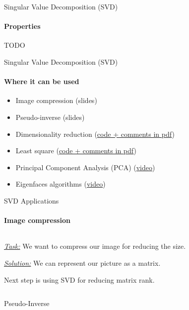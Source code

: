 \documentclass[aspectratio=169]{beamer}
\begin{document}
\begin{frame}[t]{Singular Value Decomposition (SVD)}
\framesubtitle{Properties}
    TODO
\end{frame}

\begin{frame}[t]{Singular Value Decomposition (SVD)}
\framesubtitle{Where it can be used}
\Large
    \begin{itemize}
        \item Image compression (slides)
        \item Pseudo-inverse (slides)
        \item Dimensionality reduction (\href{https://yadi.sk/i/kYK7E8whUsW1rA}{code + comments in pdf})
        \item Least square (\href{https://yadi.sk/i/DKxQ2F7AlN0zww}{code + comments in pdf})
        \item Principal Component Analysis (PCA) (\href{https://youtu.be/a9jdQGybYmE}{video})
        \item Eigenfaces algorithms (\href{https://youtu.be/_lY74pXWlS8}{video})
    \end{itemize}
\end{frame}

\begin{frame}[t]{SVD Applications}
\framesubtitle{Image compression}
\begin{columns}[T,onlytextwidth]
    \begin{column}{0.39\textwidth}
        \textit{\underline{Task:}} We want to compress our image for reducing the size.

\textit{\underline{Solution:}} We can represent our picture as a matrix. 

Next step is using SVD for reducing matrix rank. 

    \end{column}
    \begin{column}{0.59\textwidth}
        
    \end{column}
\end{columns}
    
\end{frame}

\begin{frame}[t]{Pseudo-Inverse}
\framesubtitle{}
    
\end{frame}
\end{document}
